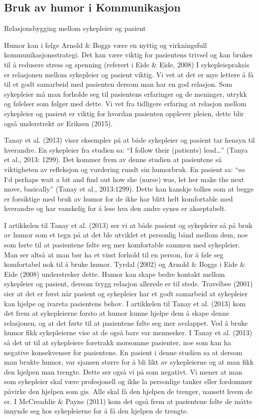 \subsection{Bruk av humor i Kommunikasjon}
Relasjonsbygging mellom sykepleier og pasient

Humor kan i følge Arnold \&{} Boggs være en nyttig og virkningsfull
kommunikasjonsstrategi. Det kan være viktig for pasientens trivsel og kan
brukes til å redusere stress og spenning (referert i Eide \&{} Eide, 2008) I
sykepleiepraksis er relasjonen mellom sykepleier og pasient viktig. Vi vet at
det er mye lettere å få til et godt samarbeid med pasienten dersom man har en
god relasjon. Som sykepleier må man forholde seg til pasientens erfaringer og
de meninger, utrykk og følelser som følger med dette. Vi vet fra tidligere
erfaring at relasjon mellom sykepleier og pasient er viktig for hvordan
pasienten opplever pleien, dette blir også understrekt av Eriksen (2015).

Tanay et al. (2013) viser eksempler på at både sykepleier og pasient tar hensyn
til hverandre. En sykepleier fra studien sa: “I follow their (patients) lead…”
(Tanya et al., 2013: 1299). Det kommer frem av denne studien at pasientene så
viktigheten av refleksjon og vurdering rundt sin humorbruk. En pasient sa: “so
I`d perhaps wait a bit and find out how she (nurse) was, let her make the next
move, basically” (Tanay et al., 2013:1299).  Dette kan kanskje tolkes som at
begge er forsiktige med bruk av humor for de ikke har blitt helt komfortable
med hverandre og har vanskelig for å lese hva den andre synes er akseptabelt.

I artikkelen til Tanay et al. (2013) ser vi at både pasient og sykepleier så på
bruk av humor som et tegn på at det ble utviklet et personlig bånd mellom dem,
noe som førte til at pasientene følte seg mer komfortable sammen med
sykepleier. Man ser altså at man bør ha et visst forhold til en person, for å
føle seg komfortabel nok til å bruke humor. Tyrdal (2002) og Arnold \&{} Boggs i
Eide \&{} Eide (2008) understreker dette. Humor kan skape bedre kontakt mellom
sykepleier og pasient, dersom trygg relasjon allerede er til stede.  Travelbee
(2001) sier at det er først når pasient og sykepleier har et godt samarbeid at
sykepleier kan hjelpe og ivareta pasientens behov. I artikkelen til Tanay et
al. (2013) kom det frem at sykepleierne forsto at humor kunne hjelpe dem å
skape denne relasjonen, og at det førte til at pasientene følte seg mer
avslappet. Ved å bruke humor fikk sykepleierne vise at de også bare var
mennesker.  I Tanay et al. (2013) så det ut til at sykepleiere foretrakk
morsomme pasienter, noe som kan ha negative konsekvenser for pasientene. En
pasient i denne studien sa at dersom man brukte humor, var sjansen større for å
bli likt av sykepleierne og at man fikk den hjelpen man trengte. Dette ser også
vi på som negativt. Vi mener at man som sykepleier skal være profesjonell og
ikke la personlige tanker eller fordommer påvirke den hjelpen som gis. Alle
skal få den hjelpen de trenger, uansett hvem de er. I McCreaddie \&{} Payne (2011)
kom det også frem at pasientene følte de måtte innynde seg hos sykepleierne for
å få den hjelpen de trengte.

